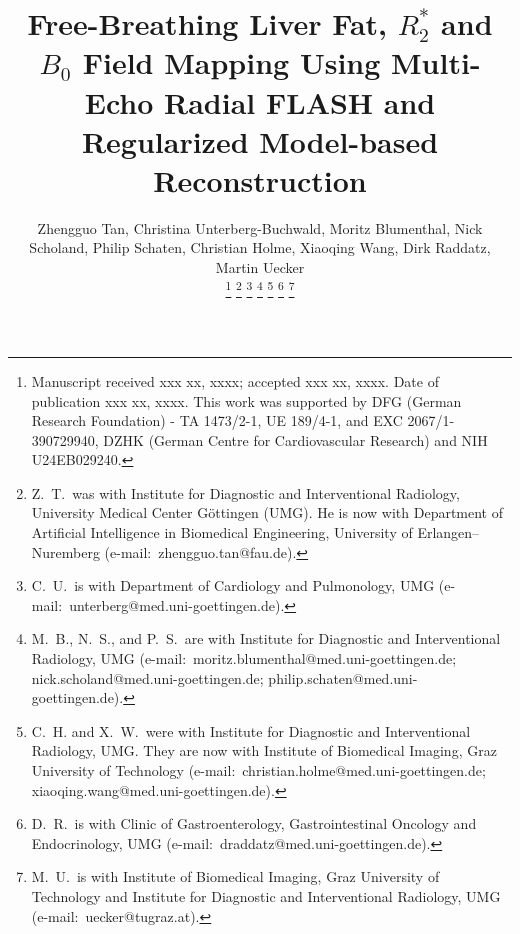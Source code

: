 \documentclass[journal,twoside,web]{ieeecolor}
\begin{document}
\title{Free-Breathing Liver Fat, $R_2^*$ and $B_0$ Field Mapping Using Multi-Echo Radial FLASH and Regularized Model-based Reconstruction}
\author{Zhengguo Tan, Christina Unterberg-Buchwald, Moritz Blumenthal, Nick Scholand, Philip Schaten, Christian Holme, Xiaoqing Wang, Dirk Raddatz, Martin Uecker

\thanks{Manuscript received xxx xx, xxxx; accepted xxx xx, xxxx. Date of publication xxx xx, xxxx.
	This work was supported by DFG (German Research Foundation) 
	- TA 1473/2-1, UE 189/4-1, and EXC 2067/1-390729940, 
	DZHK (German Centre for Cardiovascular Research) and NIH U24EB029240.}
\thanks{Z.~T.~was with Institute for Diagnostic and Interventional Radiology, 
	University Medical Center G\"ottingen (UMG). 
	He is now with Department of Artificial Intelligence in 
	Biomedical Engineering, University of Erlangen–Nuremberg 
	(e-mail:~zhengguo.tan@fau.de).}
\thanks{C.~U.~is with Department of Cardiology and Pulmonology, UMG 
	(e-mail:~unterberg@med.uni-goettingen.de).}
\thanks{M.~B., N.~S., and P.~S.~are with 
	Institute for Diagnostic and Interventional Radiology, UMG 
	(e-mail:~moritz.blumenthal@med.uni-goettingen.de; 
	nick.scholand@med.uni-goettingen.de; 
	philip.schaten@med.uni-goettingen.de).}
\thanks{C.~H. and X.~W.~were with 
	Institute for Diagnostic and Interventional Radiology, UMG. 
	They are now with Institute of Biomedical Imaging, 
	Graz University of Technology 
	(e-mail:~christian.holme@med.uni-goettingen.de; 
	xiaoqing.wang@med.uni-goettingen.de).}
\thanks{D.~R.~is with Clinic of Gastroenterology, 
	Gastrointestinal Oncology and Endocrinology, UMG 
	(e-mail:~draddatz@med.uni-goettingen.de).}
\thanks{M.~U.~is with Institute of Biomedical Imaging, 
	Graz University of Technology and 
	Institute for Diagnostic and Interventional Radiology, UMG 
	(e-mail:~uecker@tugraz.at).}}

\maketitle
\end{document}
